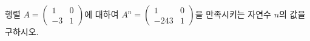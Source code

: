 행렬 $A=\begin{pmatrix} 1 & 0 \\ -3 & 1 \end{pmatrix}$에 대하여 $A^n=\begin{pmatrix} 1 & 0 \\ -243 & 1 \end{pmatrix}$을 만족시키는 자연수 $n$의 값을 구하시오.
